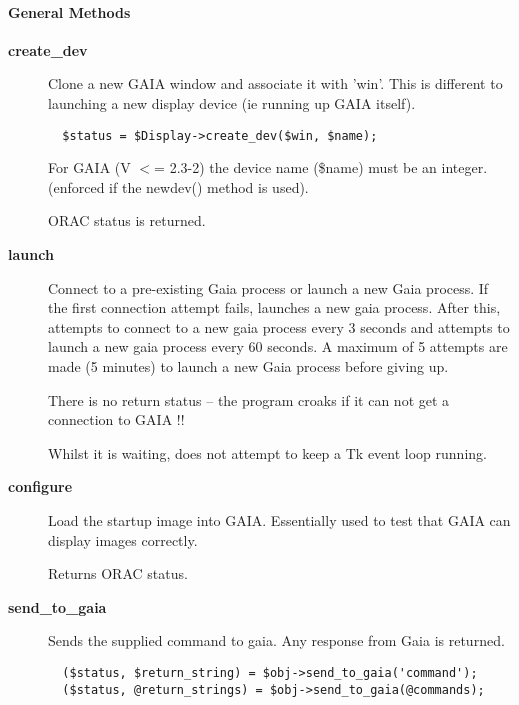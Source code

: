 \paragraph*{General Methods\label{ORAC::Display::GAIA_General_Methods}}
\begin{description}

\item[{\textbf{create\_dev}}] \mbox{}

Clone a new GAIA window and associate it with 'win'. This is different
to launching a new display device (ie running up GAIA itself).

\begin{verbatim}
  $status = $Display->create_dev($win, $name);
\end{verbatim}


For GAIA (V $<$= 2.3-2) the device name (\$name) must be an integer.
(enforced if the newdev() method is used).



ORAC status is returned.


\item[{\textbf{launch}}] \mbox{}

Connect to a pre-existing Gaia process or launch a new Gaia process.
If the first connection attempt fails, launches a new gaia process.
After this, attempts to connect to a new gaia process every 3 seconds
and attempts to launch a new gaia process every 60 seconds.
A maximum of 5 attempts are made (5 minutes) to launch a new Gaia
process before giving up.



There is no return status -- the program croaks if it can not
get a connection to GAIA !!



Whilst it is waiting, does not attempt to keep a \textsf{Tk} event loop
running.


\item[{\textbf{configure}}] \mbox{}

Load the startup image into GAIA. Essentially used to test that
GAIA can display images correctly.



Returns ORAC status.


\item[{\textbf{send\_to\_gaia}}] \mbox{}

Sends the supplied command to gaia. Any response from Gaia is returned.

\begin{verbatim}
  ($status, $return_string) = $obj->send_to_gaia('command');
  ($status, @return_strings) = $obj->send_to_gaia(@commands);
\end{verbatim}



\end{description}
